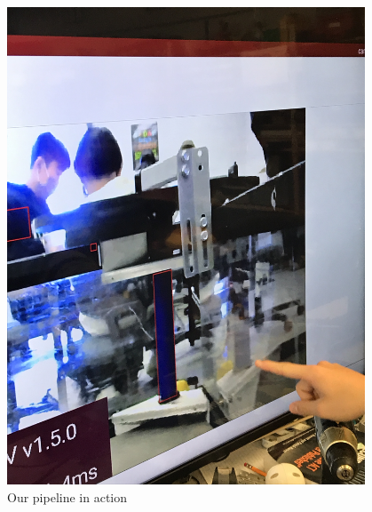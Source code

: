 \begin{figure}[ht]
\centering
\begin{minipage}[b]{.48\textwidth}
  \centering
  \includegraphics[width=0.95\textwidth]{Meetings/January/01-24-22/IMG_5646 - James Hu.JPG}
  \caption{Our pipeline in action}
  \label{fig:pic1}
\end{minipage}%
\hfill%
\begin{minipage}[b]{.48\textwidth}
  \centering

\end{minipage}
\end{figure}
